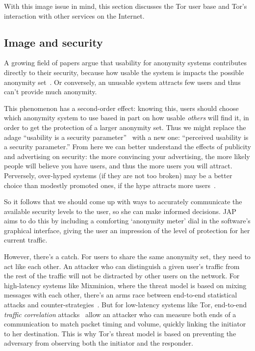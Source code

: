 \documentclass{llncs}
\begin{document}
With this image issue in mind, this section discusses the Tor user base and
Tor's interaction with other services on the Internet.

\subsection{Image and security}

A growing field of papers argue that usability for anonymity systems
contributes directly to their security, because how usable the system
is impacts the possible anonymity set~\cite{back01,econymics}. Or
conversely, an unusable system attracts few users and thus can't provide
much anonymity.

This phenomenon has a second-order effect: knowing this, users should
choose which anonymity system to use based in part on how usable
\emph{others} will find it, in order to get the protection of a larger
anonymity set. Thus we might replace the adage ``usability is a security
parameter''~\cite{back01} with a new one: ``perceived usability is a
security parameter.'' From here we can better understand the effects
of publicity and advertising on security: the more convincing your
advertising, the more likely people will believe you have users, and thus
the more users you will attract. Perversely, over-hyped systems (if they
are not too broken) may be a better choice than modestly promoted ones,
if the hype attracts more users~\cite{usability-network-effect}.

So it follows that we should come up with ways to accurately communicate
the available security levels to the user, so she can make informed
decisions. JAP aims to do this by including a
comforting `anonymity meter' dial in the software's graphical interface,
giving the user an impression of the level of protection for her current
traffic.

However, there's a catch. For users to share the same anonymity set,
they need to act like each other. An attacker who can distinguish
a given user's traffic from the rest of the traffic will not be
distracted by other users on the network. For high-latency systems like
Mixminion, where the threat model is based on mixing messages with each
other, there's an arms race between end-to-end statistical attacks and
counter-strategies~\cite{statistical-disclosure,minion-design,e2e-traffic,trickle02}.
But for low-latency systems like Tor, end-to-end \emph{traffic
correlation} attacks~\cite{danezis-pet2004,SS03,defensive-dropping}
allow an attacker who can measure both ends of a communication
to match packet timing and volume, quickly linking
the initiator to her destination. This is why Tor's threat model is
based on preventing the adversary from observing both the initiator and
the responder.
\end{document}
